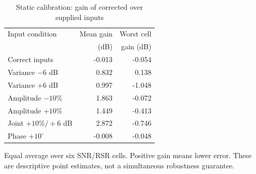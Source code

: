 \begin{table}[!t]
\caption{Static calibration: gain of corrected over supplied inputs}
\centering\small\setlength{\tabcolsep}{3pt}
\begin{tabular}{@{}lrr@{}}\toprule
Input condition & Mean gain & Worst cell\\
 & (dB) & gain (dB)\\\midrule
Correct inputs & -0.013 & -0.054\\
Variance $-6$ dB & 0.832 & 0.138\\
Variance $+6$ dB & 0.997 & -1.048\\
Amplitude $-10\%$ & 1.863 & -0.072\\
Amplitude $+10\%$ & 1.449 & -0.413\\
Joint $+10\%/+6$ dB & 2.872 & -0.746\\
Phase $+10^\circ$ & -0.008 & -0.048\\
\bottomrule\end{tabular}
\parbox{\columnwidth}{\footnotesize Equal average over six SNR/RSR cells.
Positive gain means lower error. These are descriptive point estimates,
not a simultaneous robustness guarantee.}
\end{table}

